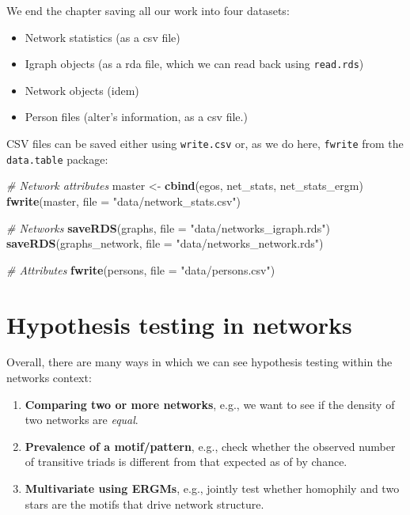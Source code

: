 \documentclass[
]{book}
\newenvironment{Shaded}{\begin{snugshade}}{\end{snugshade}}
\newcommand{\AttributeTok}[1]{\textcolor[rgb]{0.13,0.29,0.53}{#1}}
\newcommand{\CommentTok}[1]{\textcolor[rgb]{0.56,0.35,0.01}{\textit{#1}}}
\newcommand{\FunctionTok}[1]{\textcolor[rgb]{0.13,0.29,0.53}{\textbf{#1}}}
\newcommand{\NormalTok}[1]{#1}
\newcommand{\OtherTok}[1]{\textcolor[rgb]{0.56,0.35,0.01}{#1}}
\newcommand{\StringTok}[1]{\textcolor[rgb]{0.31,0.60,0.02}{#1}}
\begin{document}
We end the chapter saving all our work into four datasets:

\begin{itemize}
\item
  Network statistics (as a csv file)
\item
  Igraph objects (as a rda file, which we can read back using \texttt{read.rds})
\item
  Network objects (idem)
\item
  Person files (alter's information, as a csv file.)
\end{itemize}

CSV files can be saved either using \texttt{write.csv} or, as we do here, \texttt{fwrite} from the \texttt{data.table} package:

\begin{Shaded}
\begin{Highlighting}[]
\CommentTok{\# Network attributes}
\NormalTok{master }\OtherTok{\textless{}{-}} \FunctionTok{cbind}\NormalTok{(egos, net\_stats, net\_stats\_ergm)}
\FunctionTok{fwrite}\NormalTok{(master, }\AttributeTok{file =} \StringTok{"data/network\_stats.csv"}\NormalTok{)}

\CommentTok{\# Networks}
\FunctionTok{saveRDS}\NormalTok{(graphs, }\AttributeTok{file =} \StringTok{"data/networks\_igraph.rds"}\NormalTok{)}
\FunctionTok{saveRDS}\NormalTok{(graphs\_network, }\AttributeTok{file =} \StringTok{"data/networks\_network.rds"}\NormalTok{)}

\CommentTok{\# Attributes}
\FunctionTok{fwrite}\NormalTok{(persons, }\AttributeTok{file =} \StringTok{"data/persons.csv"}\NormalTok{)}
\end{Highlighting}
\end{Shaded}

\hypertarget{hypothesis-testing-in-networks}{%
\chapter{Hypothesis testing in networks}\label{hypothesis-testing-in-networks}}

Overall, there are many ways in which we can see hypothesis testing within
the networks context:

\begin{enumerate}
\def\labelenumi{\arabic{enumi}.}
\item
  \textbf{Comparing two or more networks}, e.g., we want to see if the density of
  two networks are \emph{equal}.
\item
  \textbf{Prevalence of a motif/pattern}, e.g., check whether the observed number
  of transitive triads is different from that expected as of by chance.
\item
  \textbf{Multivariate using ERGMs}, e.g., jointly test whether homophily and
  two stars are the motifs that drive network structure.
\end{enumerate}
\end{document}
